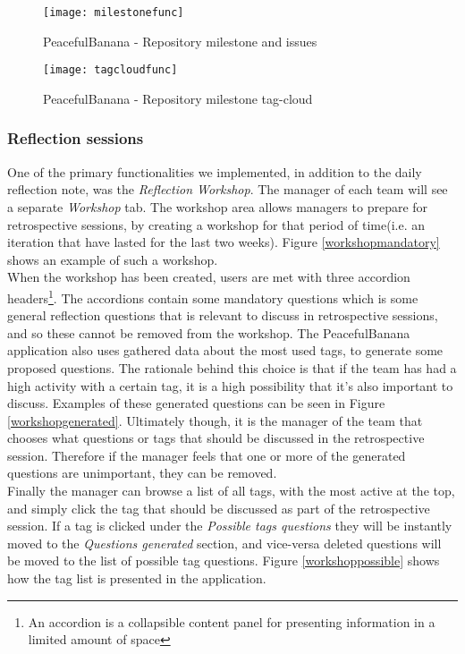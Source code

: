 \begin{figure}[H]
    \centering
        \texttt{[image: milestonefunc]}
    \caption{PeacefulBanana - Repository milestone and issues}
    \label{milestonefunc}
\end{figure}

\begin{figure}[H]
    \centering
        \texttt{[image: tagcloudfunc]}
    \caption{PeacefulBanana - Repository milestone tag-cloud}
    \label{tagcloudfunc}
\end{figure}

\subsubsection{Reflection sessions}
One of the primary functionalities we implemented, in addition to the daily reflection note, was the \emph{Reflection Workshop}. The manager of each team will see a separate \emph{Workshop} tab. The workshop area allows managers to prepare for retrospective sessions, by creating a workshop for that period of time(i.e. an iteration that have lasted for the last two weeks). Figure \ref{workshopmandatory} shows an example of such a workshop. \\ 
When the workshop has been created, users are met with three accordion headers\footnote{An accordion is a collapsible content panel for presenting information in a limited amount of space}. The accordions contain some mandatory questions which is some general reflection questions that is relevant to discuss in retrospective sessions, and so these cannot be removed from the workshop. The PeacefulBanana application also uses gathered data about the most used tags, to generate some proposed questions. The rationale behind this choice is that if the team has had a high activity with a certain tag, it is a high possibility that it's also important to discuss. Examples of these generated questions can be seen in Figure \ref{workshopgenerated}. Ultimately though, it is the manager of the team that chooses what questions or tags that should be discussed in the retrospective session. Therefore if the manager feels that one or more of the generated questions are unimportant, they can be removed. \\
Finally the manager can browse a list of all tags, with the most active at the top, and simply click the tag that should be discussed as part of the retrospective session. If a tag is clicked under the \emph{Possible tags questions} they will be instantly moved to the \emph{Questions generated} section, and vice-versa deleted questions will be moved to the list of possible tag questions. Figure \ref{workshoppossible} shows how the tag list is presented in the application. 

